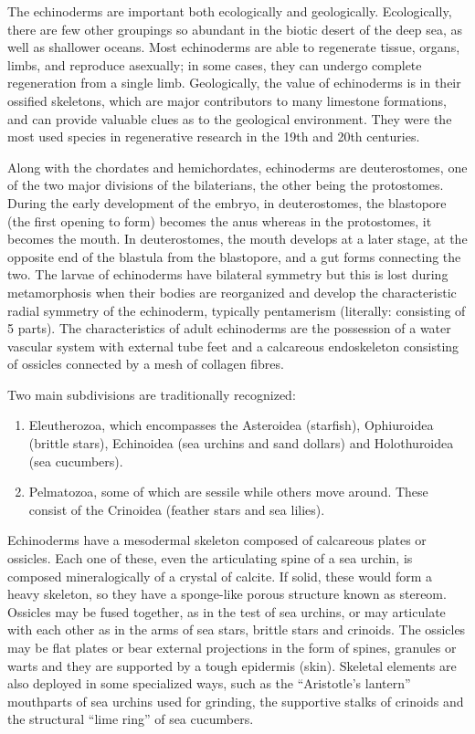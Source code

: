 The echinoderms are important both ecologically and geologically.
Ecologically, there are few other groupings so abundant in the biotic
desert of the deep sea, as well as shallower oceans. Most echinoderms
are able to regenerate tissue, organs, limbs, and reproduce asexually;
in some cases, they can undergo complete regeneration from a single
limb. Geologically, the value of echinoderms is in their ossified
skeletons, which are major contributors to many limestone formations,
and can provide valuable clues as to the geological environment. They
were the most used species in regenerative research in the 19th and 20th
centuries.

Along with the chordates and hemichordates, echinoderms are
deuterostomes, one of the two major divisions of the bilaterians, the
other being the protostomes. During the early development of the embryo,
in deuterostomes, the blastopore (the first opening to form) becomes the
anus whereas in the protostomes, it becomes the mouth. In deuterostomes,
the mouth develops at a later stage, at the opposite end of the blastula
from the blastopore, and a gut forms connecting the two. The larvae of
echinoderms have bilateral symmetry but this is lost during
metamorphosis when their bodies are reorganized and develop the
characteristic radial symmetry of the echinoderm, typically pentamerism
(literally: consisting of 5 parts). The characteristics of adult
echinoderms are the possession of a water vascular system with external
tube feet and a calcareous endoskeleton consisting of ossicles connected
by a mesh of collagen fibres.

Two main subdivisions are traditionally recognized:

\begin{enumerate}
\def\labelenumi{\arabic{enumi}.}
\tightlist
\item
  Eleutherozoa, which encompasses the Asteroidea (starfish), Ophiuroidea
  (brittle stars), Echinoidea (sea urchins and sand dollars) and
  Holothuroidea (sea cucumbers).
\item
  Pelmatozoa, some of which are sessile while others move around. These
  consist of the Crinoidea (feather stars and sea lilies).
\end{enumerate}

Echinoderms have a mesodermal skeleton composed of calcareous plates or
ossicles. Each one of these, even the articulating spine of a sea
urchin, is composed mineralogically of a crystal of calcite. If solid,
these would form a heavy skeleton, so they have a sponge-like porous
structure known as stereom. Ossicles may be fused together, as in the
test of sea urchins, or may articulate with each other as in the arms of
sea stars, brittle stars and crinoids. The ossicles may be flat plates
or bear external projections in the form of spines, granules or warts
and they are supported by a tough epidermis (skin). Skeletal elements
are also deployed in some specialized ways, such as the ``Aristotle's
lantern'' mouthparts of sea urchins used for grinding, the supportive
stalks of crinoids and the structural ``lime ring'' of sea cucumbers.


